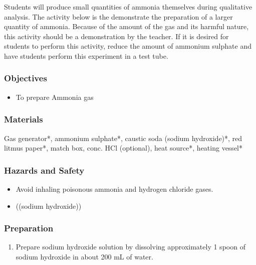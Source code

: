 Students will produce small quantities of ammonia themselves during qualitative analysis. The activity below is the demonstrate the preparation of a larger quantity of ammonia. Because of the amount of the gas and its harmful nature, this activity should be a demonstration by the teacher. If it is desired for students to perform this activity, reduce the amount of ammonium sulphate and have students perform this experiment in a test tube.

\subsubsection*{Objectives}
\begin{itemize}
\item{To prepare Ammonia gas}
\end{itemize}

\subsubsection*{Materials}
Gas generator*, ammonium sulphate*, caustic soda (sodium hydroxide)*, red litmus paper*, match box, conc. HCl (optional), heat source*, heating vessel*

\subsubsection*{Hazards and Safety}
\begin{itemize}
\item{Avoid inhaling poisonous ammonia and hydrogen chloride gases.}
\item{((sodium hydroxide))}
\end{itemize}

\subsubsection*{Preparation}
\begin{enumerate}
\item{Prepare sodium hydroxide solution by dissolving approximately 1 spoon of sodium hydroxide in about 200 mL of water.}
\end{enumerate}

